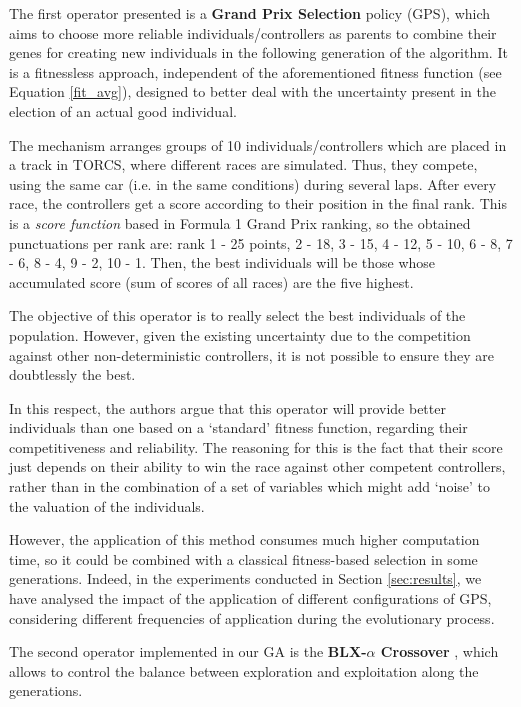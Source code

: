 \documentclass[10pt,journal,compsoc]{IEEEtran}
\begin{document}
The first operator presented is a \textbf{Grand Prix Selection} policy (GPS), which aims to choose more reliable individuals/controllers as parents to combine their genes for creating new individuals in the following generation of the algorithm.
It is a fitnessless approach, independent of the aforementioned fitness function (see Equation \ref{fit_avg}), designed to better deal with the uncertainty present in the election of an actual good individual.

The mechanism arranges groups of 10 individuals/controllers which are placed in a track in TORCS, where different races are simulated. Thus, they compete, using the same car (i.e. in the same conditions) during several laps. After every race, the controllers get a score according to their position in the final rank. This is a \textit{score function} based in Formula 1 Grand Prix ranking, so the obtained punctuations per rank are: rank 1 - 25 points, 2 - 18, 3 - 15, 4 - 12, 5 - 10, 6 - 8, 7 - 6, 8 - 4, 9 - 2, 10 - 1.
Then, the best individuals will be those whose accumulated score (sum of scores of all races) are the five highest.

The objective of this operator is to really select the best individuals of the population. However, given the existing uncertainty \cite{merelo2016statistical} due to the competition against other non-deterministic controllers, it is not possible to ensure they are doubtlessly the best.

In this respect, the authors argue that this operator will provide better individuals than one based on a `standard' fitness function, regarding their competitiveness and reliability. The reasoning for this is the fact that their score just depends on their ability to win the race against other competent controllers, rather than in the combination of a set of variables which might add `noise' to the valuation of the individuals.

However, the application of this method consumes much higher computation time, so it could be combined with a classical fitness-based selection in some generations. Indeed, in the experiments conducted in Section \ref{sec:results}, we have analysed the impact of the application of different configurations of GPS, considering different frequencies of application during the evolutionary process.


The second operator implemented in our GA is the \textbf{BLX-$\alpha$ Crossover} \cite{blx2008}, which allows to control the balance between exploration and exploitation along the generations.
\end{document}

